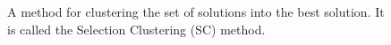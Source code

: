 \begin{figure}[H]
	\centering
	
	\vspace*{0.5\baselineskip}
	\caption*{%
		A method for clustering the set of solutions into the best solution. It is called the Selection Clustering (SC) method.
	}
	\vspace*{0.5\baselineskip}
	\label{
		fig:x-transit-hub--clustering-method
	}
\end{figure}
